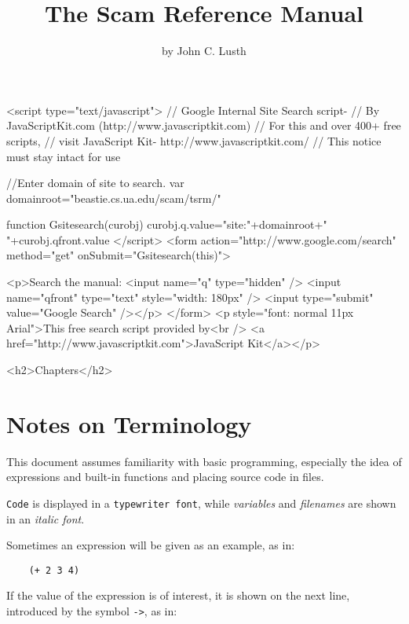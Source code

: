 \documentclass{book}
\title{The Scam Reference Manual}
\author{by John C. Lusth}
\begin{document}
\maketitle

\W\htmlrule
\W{}
\W\htmlrule


\begin{rawxml}

<script
    type="text/javascript">
    // Google Internal Site Search script-
    // By JavaScriptKit.com (http://www.javascriptkit.com)
    // For this and over 400+ free scripts,
    // visit JavaScript Kit- http://www.javascriptkit.com/
    // This notice must stay intact for use

    //Enter domain of site to search.
    var domainroot="beastie.cs.ua.edu/scam/tsrm/"

    function Gsitesearch(curobj)
        {
        curobj.q.value="site:"+domainroot+" "+curobj.qfront.value
        }
    </script>
<form
    action="http://www.google.com/search"
    method="get" onSubmit="Gsitesearch(this)">

    <p>Search the manual: 
    <input name="q" type="hidden" />
    <input name="qfront" type="text" style="width: 180px" />
    <input type="submit" value="Google Search" /></p>
    </form>
<p style="font: normal 11px Arial">This free search script provided by<br />
<a href="http://www.javascriptkit.com">JavaScript Kit</a></p>

<h2>Chapters</h2>
\end{rawxml}

\tableofcontents
\setcounter{tocdepth}{2} 

\chapter{Notes on Terminology}
\label{NotesOnTerminology}

This document assumes familiarity with basic programming,
especially the idea of expressions and built-in functions
and placing source code in files.

\verb!Code! is displayed in a \verb!typewriter font!, while {\it variables}
and {\it filenames} are shown in an {\it italic font}.

Sometimes an expression will be given as an example, as in:

\begin{verbatim}
    (+ 2 3 4)
\end{verbatim}

If the value of the expression is of interest, it is shown
on the next line, introduced by the symbol \verb!->!, as in:
\end{document}
